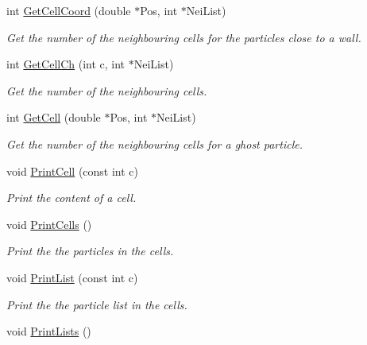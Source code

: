 \begin{DoxyCompactItemize}
int \hyperlink{classDomDecBasics_af2721958380b0ab29aed010a01b93ab8}{Get\+Cell\+Coord} (double $\ast$Pos, int $\ast$Nei\+List)
\begin{DoxyCompactList}\small\item\em Get the number of the neighbouring cells for the particles close to a wall. \end{DoxyCompactList}\item 
int \hyperlink{classDomDecBasics_aa02df5ddcb998bf1a8f221f1bf14e063}{Get\+Cell\+Ch} (int c, int $\ast$Nei\+List)
\begin{DoxyCompactList}\small\item\em Get the number of the neighbouring cells. \end{DoxyCompactList}\item 
int \hyperlink{classDomDecBasics_a1d363b247b350543ea601e5f41a405eb}{Get\+Cell} (double $\ast$Pos, int $\ast$Nei\+List)
\begin{DoxyCompactList}\small\item\em Get the number of the neighbouring cells for a ghost particle. \end{DoxyCompactList}\item 
void \hyperlink{classDomDecBasics_af5188eb0e6caae79f8bf349bf2345cf2}{Print\+Cell} (const int c)\hypertarget{classDomDecBasics_af5188eb0e6caae79f8bf349bf2345cf2}{}\label{classDomDecBasics_af5188eb0e6caae79f8bf349bf2345cf2}

\begin{DoxyCompactList}\small\item\em Print the content of a cell. \end{DoxyCompactList}\item 
void \hyperlink{classDomDecBasics_a1132024d8fdd721fd6a36781d4235162}{Print\+Cells} ()\hypertarget{classDomDecBasics_a1132024d8fdd721fd6a36781d4235162}{}\label{classDomDecBasics_a1132024d8fdd721fd6a36781d4235162}

\begin{DoxyCompactList}\small\item\em Print the the particles in the cells. \end{DoxyCompactList}\item 
void \hyperlink{classDomDecBasics_abacbda4ce7eed0eee33efe489157ff81}{Print\+List} (const int c)\hypertarget{classDomDecBasics_abacbda4ce7eed0eee33efe489157ff81}{}\label{classDomDecBasics_abacbda4ce7eed0eee33efe489157ff81}

\begin{DoxyCompactList}\small\item\em Print the the particle list in the cells. \end{DoxyCompactList}\item 
void \hyperlink{classDomDecBasics_aff89725be8d743f07f318ef0c06858e1}{Print\+Lists} ()\hypertarget{classDomDecBasics_aff89725be8d743f07f318ef0c06858e1}{}\label{classDomDecBasics_aff89725be8d743f07f318ef0c06858e1}


\end{DoxyCompactItemize}
